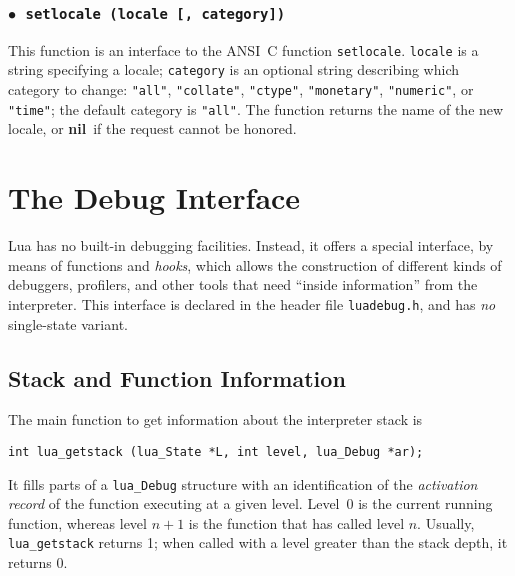 \documentclass[11pt]{article}
\newcommand{\T}[1]{{\tt #1}}
\newcommand{\Math}[1]{$#1$}
\newcommand{\nil}{{\bf nil}}
\newcommand{\Deffunc}[1]{\index{#1}}
\newcommand{\ff}{$\bullet$\ }
\begin{document}
\subsubsection*{\ff \T{setlocale (locale [, category])}}\Deffunc{setlocale}

This function is an interface to the ANSI~C function \verb|setlocale|.
\verb|locale| is a string specifying a locale;
\verb|category| is an optional string describing which category to change:
\verb|"all"|, \verb|"collate"|, \verb|"ctype"|,
\verb|"monetary"|, \verb|"numeric"|, or \verb|"time"|;
the default category is \verb|"all"|.
The function returns the name of the new locale,
or \nil\ if the request cannot be honored.


\section{The Debug Interface} \label{debugI}

Lua has no built-in debugging facilities.
Instead, it offers a special interface,
by means of functions and \emph{hooks},
which allows the construction of different
kinds of debuggers, profilers, and other tools
that need ``inside information'' from the interpreter.
This interface is declared in the header file \verb|luadebug.h|,
and has \emph{no} single-state variant.

\subsection{Stack and Function Information}

\Deffunc{lua_getstack}
The main function to get information about the interpreter stack is
\begin{verbatim}
int lua_getstack (lua_State *L, int level, lua_Debug *ar);
\end{verbatim}
It fills parts of a \verb|lua_Debug| structure with
an identification of the \emph{activation record}
of the function executing at a given level.
Level~0 is the current running function,
whereas level \Math{n+1} is the function that has called level \Math{n}.
Usually, \verb|lua_getstack| returns 1;
when called with a level greater than the stack depth,
it returns 0.
\end{document}
